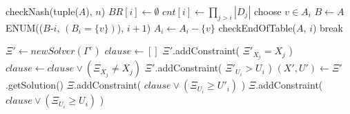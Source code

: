 \documentclass{article}
\begin{document}
\captionsetup[algorithm]{font=footnotesize}

\begin{algorithm}[H]
    \caption{Enumerate the strategy profiles in the CG-Enum-PNE \cite{nguyen:2015}}
    \footnotesize
    \begin{algorithmic}[1]
                \State checkNash(tuple($A$), $n$)
            \Else
                \State $BR[i] \gets \emptyset$
                \State $cnt[i] \gets \prod_{j>i} |D_j|$
                    \State choose $v \in A_i$
                    \State $B \gets A$
                    \State ENUM(($B$-$i$, $(B_i = \{v\})$), $i+1$)
                    \State $A_i \gets A_i - \{v\}$
                        \State checkEndOfTable($A$, $i$)
                        \State break
                    \EndIf
                \EndWhile
            \EndIf
        \EndIf
    \EndProcedure
    \end{algorithmic}
    \label{alg:enum}
\end{algorithm}

\begin{algorithm}[H]
    \caption{UGCL propagator}
    \footnotesize
    \begin{algorithmic}[1]
                \State $\Xi' \leftarrow newSolver(\Gamma^c)$
                \State $clause \leftarrow []$
                    \State $\Xi'$.addConstraint( $\Xi'_{X_j} = X_j$ )
                    \State $clause \leftarrow clause \vee (\Xi_{X_j} \ne X_j)$
                \EndFor
                \State $\Xi'$.addConstraint( $\Xi'_{U_i} > U_i$ )
                \State $(X',U') \leftarrow \Xi'$.getSolution()
                    \State $\Xi$.addConstraint( $clause \vee (\Xi_{U_i} \geqslant U'_i)$ )
                    \State {} 
                \EndIf
                \State $\Xi$.addConstraint( $clause \vee (\Xi_{U_i} \geqslant U_i)$ )
            \EndFor
        \EndIf
        \State {}
    \EndFunction
    \end{algorithmic}
    \label{alg:ugcl}
\end{algorithm}
\end{document}
